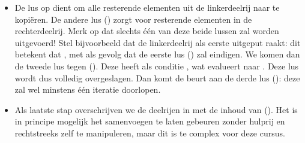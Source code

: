 \begin{itemize}
  \item De lus op 
        dient om alle resterende elementen uit de linkerdeelrij naar  te kopi\"eren.
        De andere lus
        ()
        zorgt voor resterende elementen in de rechterdeelrij. Merk op dat slechts \'e\'en van deze
        beide lussen zal worden uitgevoerd! Stel bijvoorbeeld dat de linkerdeelrij
        als eerste uitgeput raakt: dit betekent dat , met als gevolg
        dat de eerste lus
        ()
        zal eindigen. We komen dan de tweede lus tegen
        ().
        Deze heeft als conditie , wat evalueert naar .
        Deze lus wordt dus volledig overgeslagen. Dan komt de beurt aan de derde lus
        ():
        deze zal wel minstens \'e\'en iteratie doorlopen.
  \item Als laatste stap overschrijven we de deelrijen in 
        met de inhoud van 
        ().
        Het is in principe mogelijk het samenvoegen te laten gebeuren
        zonder hulprij  en rechtstreeks  zelf te manipuleren,
        maar dit is te complex voor deze cursus.
\end{itemize}

